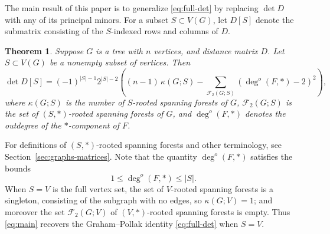 \documentclass{amsart}
\newtheorem{thm}{Theorem}
\theoremstyle{definition}
\newcommand{\forests}{\mathcal{F}}
\newcommand{\degout}{\deg^o}
\begin{document}
The main result of this paper is to generalize \eqref{eq:full-det} by replacing $\det D$ with any of its principal minors.
For a subset $S \subset V(G)$, let $D[S]$ denote the submatrix consisting of the $S$-indexed rows and columns of $D$.
\begin{thm}
\label{thm:main}
Suppose $G$ is a tree with $n$ vertices, 
and distance matrix $D$.
Let $S \subset V(G)$ be a nonempty subset of vertices.
Then
\begin{equation}\label{eq:main}
\det D[S] = (-1)^{|S|-1} 2^{|S|-2} \left( (n-1)\, \kappa(G;S)  - \sum_{\mathcal F_2(G;S)} \left(\degout(F,*) - 2\right)^2  \right),
\end{equation}
where 
$\kappa(G;S)$ is the number of $S$-rooted spanning forests of $G$,
$\forests_2(G;S)$ is the set of $(S,*)$-rooted spanning forests of $G$,
and
$\degout(F,*)$ denotes the outdegree of the $*$-component of $F$.
\end{thm}
For definitions of $(S,*)$-rooted spanning forests and other terminology, see Section~\ref{sec:graphs-matrices}.
Note that the quantity $\degout(F,*)$ 
satisfies the bounds
\[
1 \leq \degout(F,*) \leq |S|.
\]
When $S = V$ is the full vertex set, the set of $V$-rooted spanning forests is a singleton, consisting of the subgraph with no edges, 
so $\kappa(G; V) = 1$; and moreover the set $\forests_2(G; V)$ of $(V, *)$-rooted spanning forests is empty. 
Thus \eqref{eq:main} recovers the Graham--Pollak identity \eqref{eq:full-det} when $S = V$.
\end{document}
